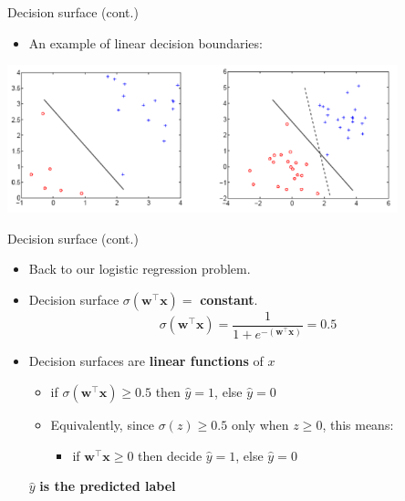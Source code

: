 \documentclass[serif, aspectratio=169]{beamer}
\begin{document}
\begin{frame}{Decision surface (cont.)}

    \begin{itemize}
        \item An example of linear decision boundaries:
    \end{itemize}
    \begin{center}
        \includegraphics[width=0.85\textwidth]{pic/DBoundary.png}
    \end{center}
\end{frame}

\begin{frame}{Decision surface (cont.)}
    \begin{itemize}
      \item Back to our logistic regression problem.
      \item Decision surface $\sigma (\mathbf{w}^\top \mathbf{x}) = $ \textbf{constant}.
        \[
            \sigma (\mathbf{w}^\top \mathbf{x}) = \frac{1}{1 + e^{-(\mathbf{w}^\top \mathbf{x})}} = 0.5
        \]
      \item Decision surfaces are \textbf{linear functions} of $x$
        \begin{itemize}
            \item if $\sigma (\mathbf{w}^\top \mathbf{x}) \geq 0.5$ then $\hat{y}=1$, else $\hat{y} = 0$
            \item Equivalently, since $\sigma(z) \ge 0.5$ only when $z \ge 0$, this means:
            \begin{itemize}
                \item if $\mathbf{w}^\top \mathbf{x} \geq 0$ then decide $\hat{y}=1$, else $\hat{y}=0$
            \end{itemize}
        \end{itemize}%
        \vfill
        \begin{center}
            \( \hat{y} \) \textbf{is the predicted label}
        \end{center}
    \end{itemize}
\end{frame}
\end{document}
